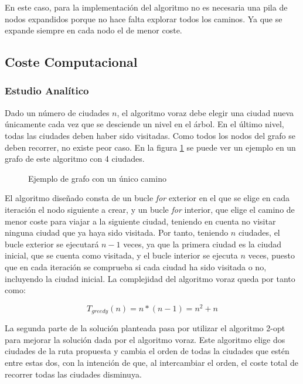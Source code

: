 \documentclass{uc3mpracticas}
\begin{document}
  \vspace{2mm}

  En este caso, para la implementación del algoritmo no es necesaria una pila de nodos expandidos porque no hace falta explorar todos los caminos. Ya que se expande siempre en cada nodo el de menor coste. 


  

  \subsection{Coste Computacional}
  
  \subsubsection{Estudio Analítico}

  Dado un número de ciudades $n$, el algoritmo voraz debe elegir una ciudad nueva únicamente cada vez que se desciende un nivel en el árbol. En el último nivel, todas las ciudades deben haber sido visitadas. Como todos los nodos del grafo se deben recorrer, no existe peor caso. En la figura \ref{fig:ejGreedy} se puede ver un ejemplo en un grafo de este algoritmo con 4 ciudades.
  
  \begin{figure}[!h]
    \caption{Ejemplo de grafo con un único camino}
    \label{fig:ejGreedy}
  \end{figure}
  
  El algoritmo diseñado consta de un bucle \textit{for} exterior en el que se elige en cada iteración el nodo siguiente a crear, y un bucle \textit{for} interior, que elige el camino de menor coste para viajar a la siguiente ciudad, teniendo en cuenta no visitar ninguna ciudad que ya haya sido visitada. Por tanto, teniendo $n$ ciudades, el bucle exterior se ejecutará $n - 1$ veces, ya que la primera ciudad es la ciudad inicial, que se cuenta como visitada, y el bucle interior se ejecuta $n$ veces, puesto que en cada iteración se comprueba si cada ciudad ha sido visitada o no, incluyendo la ciudad inicial. La complejidad del algoritmo voraz queda por tanto como:
  
  $$T_{greedy}(n) = n*(n-1) = n^2 + n$$

  \vspace{2mm}
  
  La segunda parte de la solución planteada pasa por utilizar el algoritmo 2-opt para mejorar la solución dada por el algoritmo voraz. Este algoritmo elige dos ciudades de la ruta propuesta y cambia el orden de todas la ciudades que estén entre estas dos, con la intención de que, al intercambiar el orden, el coste total de recorrer todas las ciudades disminuya.
\end{document}

